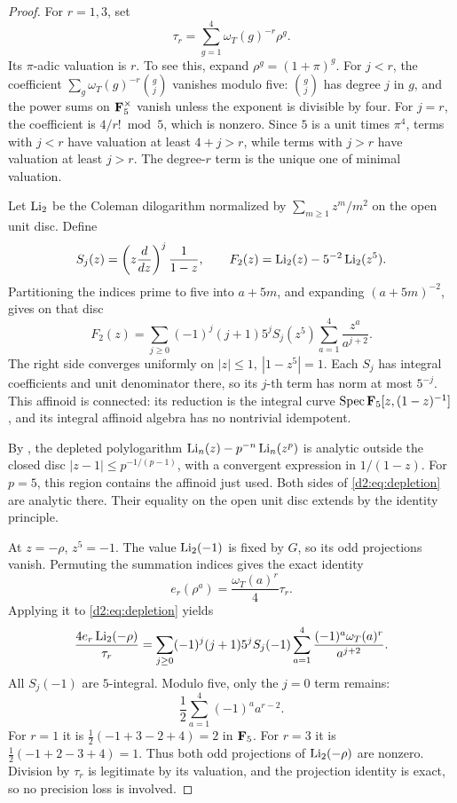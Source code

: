 \begin{proof}
For \(r=1,3\), set
\[
 \tau_r=\sum_{g=1}^4\omega_T(g)^{-r}\rho^g.
\]
Its \(\pi\)-adic valuation is \(r\).
To see this, expand \(\rho^g=(1+\pi)^g\).
For \(j<r\), the coefficient
\(\sum_g\omega_T(g)^{-r}\binom gj\) vanishes modulo five:
\(\binom gj\) has degree \(j\) in \(g\), and the power sums on
\(\mathbf{F}_5^\times\) vanish unless the exponent is divisible by four.
For \(j=r\), the coefficient is \(4/r!\bmod5\), which is nonzero.
Since \(5\) is a unit times \(\pi^4\), terms with \(j<r\)
have valuation at least \(4+j>r\), while terms with \(j>r\)
have valuation at least \(j>r\).
The degree-\(r\) term is the unique one of minimal valuation.

Let \(\operatorname{Li}_2\) be the Coleman dilogarithm normalized by
\(\sum_{m\ge1}z^m/m^2\) on the open unit disc.
Define
\[
 S_j(z)=\left(z\frac d{dz}\right)^j\frac1{1-z},
 \qquad
 F_2(z)=\operatorname{Li}_2(z)-5^{-2}\operatorname{Li}_2(z^5).
\]
Partitioning the indices prime to five into \(a+5m\), and expanding
\((a+5m)^{-2}\), gives on that disc
\begin{equation}\label{d2:eq:depletion}
 F_2(z)=
 \sum_{j\ge0}(-1)^j(j+1)5^jS_j(z^5)
       \sum_{a=1}^4\frac{z^a}{a^{j+2}}.
\end{equation}
The right side converges uniformly on
\(|z|\le1,\ |1-z^5|=1\).
Each \(S_j\) has integral coefficients and unit denominator there,
so its \(j\)-th term has norm at most \(5^{-j}\).
This affinoid is connected: its reduction is the integral curve
\(\operatorname{Spec}\mathbf{F}_5[z,(1-z)^{-1}]\), and its integral affinoid algebra
has no nontrivial idempotent.

By \cite[Theorem~2.7(3)]{BesserDeJeuAlgorithm}, the depleted polylogarithm
\(\operatorname{Li}_n(z)-p^{-n}\operatorname{Li}_n(z^p)\) is analytic outside the closed disc
\(|z-1|\le p^{-1/(p-1)}\), with a convergent expression in
\(1/(1-z)\).
For \(p=5\), this region contains the affinoid just used.
Both sides of \eqref{d2:eq:depletion} are analytic there.
Their equality on the open unit disc extends by the identity
principle.

At \(z=-\rho\), \(z^5=-1\).
The value \(\operatorname{Li}_2(-1)\) is fixed by \(G\), so its odd projections
vanish.
Permuting the summation indices gives the exact identity
\[
 e_r(\rho^a)=\frac{\omega_T(a)^r}{4}\tau_r.
\]
Applying it to \eqref{d2:eq:depletion} yields
\begin{equation}\label{d2:eq:odd-dilogarithms}
 \frac{4e_r\operatorname{Li}_2(-\rho)}{\tau_r}
 =
 \sum_{j\ge0}(-1)^j(j+1)5^jS_j(-1)
    \sum_{a=1}^4\frac{(-1)^a\omega_T(a)^r}{a^{j+2}}.
\end{equation}
All \(S_j(-1)\) are \(5\)-integral.
Modulo five, only the \(j=0\) term remains:
\[
 \frac12\sum_{a=1}^4(-1)^aa^{r-2}.
\]
For \(r=1\) it is
\(\frac12(-1+3-2+4)=2\) in \(\mathbf{F}_5\).
For \(r=3\) it is
\(\frac12(-1+2-3+4)=1\).
Thus both odd projections of \(\operatorname{Li}_2(-\rho)\) are nonzero.
Division by \(\tau_r\) is legitimate by its valuation, and the
projection identity is exact, so no precision loss is involved.


\end{proof}
